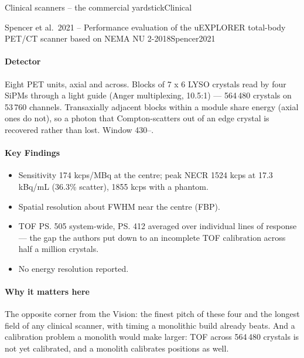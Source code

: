 \begin{programnote}{Clinical scanners -- the commercial yardstick}{Clinical}
\begin{papernote}{Spencer et al.\ 2021 -- Performance evaluation of the uEXPLORER total-body PET/CT scanner based on NEMA NU 2-2018}{Spencer2021}
\paragraph{Detector}
Eight PET units,  axial and  across. Blocks of 7 x 6
 LYSO crystals read by four
 SiPMs through a light guide (Anger multiplexing,
10.5:1) --- 564\,480 crystals on 53\,760 channels. Transaxially adjacent
blocks within a module share energy (axial ones do not), so a photon that Compton-scatters out of an edge crystal
is recovered rather than lost. Window 430--.

\paragraph{Key Findings}
\begin{itemize}
	\item Sensitivity 174 kcps/MBq at the centre; peak NECR 1524 kcps at 17.3
		kBq/mL (36.3\% scatter), 1855 kcps with a  phantom.
	\item Spatial resolution about  FWHM near the centre (FBP).
	\item TOF \ps{505} system-wide, \ps{412} averaged over individual lines of
		response --- the gap the authors put down to an incomplete TOF
		calibration across half a million crystals.
	\item No energy resolution reported.
\end{itemize}

\paragraph{Why it matters here}
The opposite corner from the Vision: the finest pitch of these four and the
longest field of any clinical scanner, with timing a monolithic build already beats. And a
calibration problem a monolith would make larger: TOF across 564\,480 crystals
is not yet calibrated, and a monolith calibrates positions as well.
\end{papernote}


\end{programnote}
